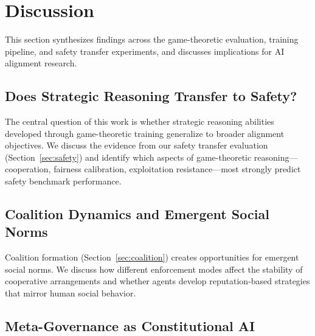 
\section{Discussion}
\label{sec:discussion-new}

This section synthesizes findings across the game-theoretic evaluation,
training pipeline, and safety transfer experiments, and discusses
implications for AI alignment research.

\subsection{Does Strategic Reasoning Transfer to Safety?}
\label{sec:transfer-discussion}


The central question of this work is whether strategic reasoning abilities
developed through game-theoretic training generalize to broader alignment
objectives. We discuss the evidence from our safety transfer evaluation
(Section~\ref{sec:safety}) and identify which aspects of game-theoretic
reasoning---cooperation, fairness calibration, exploitation resistance---most
strongly predict safety benchmark performance.

\subsection{Coalition Dynamics and Emergent Social Norms}
\label{sec:coalition-discussion}


Coalition formation (Section~\ref{sec:coalition}) creates opportunities for
emergent social norms. We discuss how different enforcement modes affect the
stability of cooperative arrangements and whether agents develop
reputation-based strategies that mirror human social behavior.

\subsection{Meta-Governance as Constitutional AI}
\label{sec:governance-discussion}


